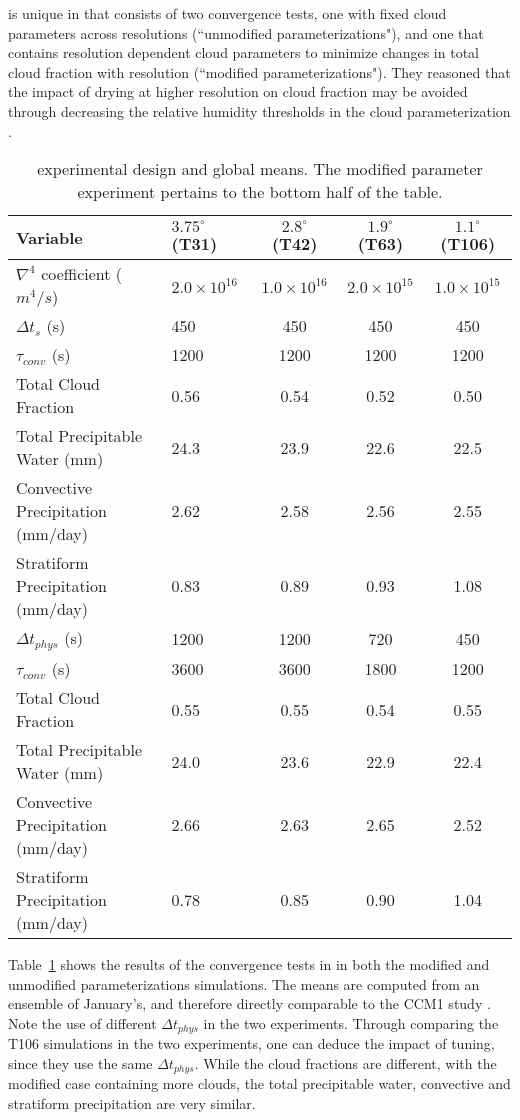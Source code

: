 \cite{WETAL1995CD} is unique in that consists of two convergence tests, one with fixed cloud parameters across resolutions (``unmodified parameterizations"), and one that contains resolution dependent cloud parameters to minimize changes in total cloud fraction with resolution (``modified parameterizations"). They reasoned that the impact of drying at higher resolution on cloud fraction may be avoided through decreasing the relative humidity thresholds in the cloud parameterization \citep{KETAL1994JGR}. 

 \begin{table}
 \caption{\cite{WETAL1995CD} experimental design and global means. The modified parameter experiment pertains to the bottom half of the table.}
 \centering
 \scriptsize
 \begin{tabular}{llccc}
 \hline
 Variable & $3.75^{\circ}$ (T31) & $2.8^{\circ}$ (T42) & $1.9^{\circ}$ (T63)  & $1.1^{\circ}$ (T106) \\
 \hline
   $\nabla^{4}$ coefficient ($m^4/s$) & $2.0 \times 10^{16}$ & $1.0 \times 10^{16}$ & $2.0 \times 10^{15}$ & $1.0 \times 10^{15}$ \\
   $\Delta t_{s}$ (s) & 450 & 450 & 450 & 450 \\
   $\tau_{conv}$ (s) & 1200 & 1200 & 1200 & 1200 \\   
   Total Cloud Fraction & 0.56 & 0.54 & 0.52 & 0.50 \\
   Total Precipitable Water (mm) & 24.3 & 23.9 & 22.6 & 22.5 \\
   Convective Precipitation (mm/day) & 2.62 & 2.58 & 2.56 & 2.55 \\
   Stratiform Precipitation (mm/day) & 0.83 & 0.89 & 0.93 & 1.08 \\  
   \hline
   $\Delta t_{phys}$ (s) & 1200 & 1200 & 720 & 450 \\
   $\tau_{conv}$ (s) & 3600 & 3600 & 1800 & 1200 \\
   Total Cloud Fraction & 0.55 & 0.55 & 0.54 & 0.55 \\
   Total Precipitable Water (mm) & 24.0 & 23.6 & 22.9 & 22.4 \\
   Convective Precipitation (mm/day) & 2.66 & 2.63 & 2.65 & 2.52 \\
   Stratiform Precipitation (mm/day) & 0.78 & 0.85 & 0.90 & 1.04 \\    
 \hline
 \end{tabular}
 \label{tbl:table1-2}
 \end{table}

Table~\ref{tbl:table1-2} shows the results of the convergence tests in \cite{WETAL1995CD} in both the modified and unmodified parameterizations simulations. The means are computed from an ensemble of January's, and therefore directly comparable to the CCM1 study \citep{KW1991JGR}. Note the use of different $\Delta t_{phys}$ in the two experiments. Through comparing the T106 simulations in the two experiments, one can deduce the impact of tuning, since they use the same $\Delta t_{phys}$. While the cloud fractions are different, with the modified case containing more clouds, the total precipitable water, convective and stratiform precipitation are very similar. 

